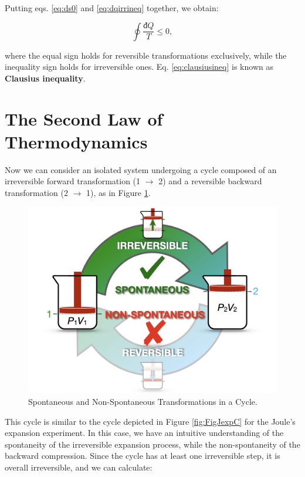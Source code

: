\documentclass[
  9pt,
]{extbook}
\theoremstyle{definition}
\theoremstyle{definition}
\theoremstyle{definition}
\theoremstyle{remark}
\begin{document}
Putting eqs. \eqref{eq:ds0} and \eqref{eq:dqirrineq} together, we obtain:

\begin{equation}
\oint \frac{đQ}{T} \leq 0,
\label{eq:clausiusineq}
\end{equation}

where the equal sign holds for reversible transformations exclusively, while the inequality sign holds for irreversible ones. Eq. \eqref{eq:clausiusineq} is known as \textbf{Clausius inequality}.

\hypertarget{secondlaw}{%
\section{The Second Law of Thermodynamics}\label{secondlaw}}

Now we can consider an isolated system undergoing a cycle composed of an irreversible forward transformation (1 \(\rightarrow\) 2) and a reversible backward transformation (2 \(\rightarrow\) 1), as in Figure \ref{fig:FigJexpC2}.

\begin{figure}

{\centering \includegraphics[width=0.8\linewidth]{./img/OEP_Figures.011} 

}

\caption{Spontaneous and Non-Spontaneous Transformations in a Cycle.}\label{fig:FigJexpC2}
\end{figure}

This cycle is similar to the cycle depicted in Figure \ref{fig:FigJexpC} for the Joule's expansion experiment. In this case, we have an intuitive understanding of the spontaneity of the irreversible expansion process, while the non-spontaneity of the backward compression. Since the cycle has at least one irreversible step, it is overall irreversible, and we can calculate:
\end{document}
